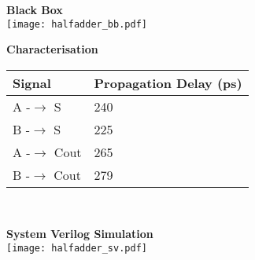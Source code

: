 \vspace{1cm}

\parbox{.45\linewidth}{
\begin{center}
\textbf{Black Box}\\[0.2cm]
 \texttt{[image: halfadder\_bb.pdf]}


\end{center}
}
\hfill
\parbox{.45\linewidth}{
\begin{center}
\textbf{Characterisation}\\[0.2cm]

    \begin{tabular}{|l|l|}
    \hline
    Signal      & Propagation Delay (ps) \\ \hline \hline
    A -$\rightarrow$ S      & 240                    \\
    B -$\rightarrow$ S      & 225                    \\
    A -$\rightarrow$ Cout   & 265                    \\
    B -$\rightarrow$ Cout   & 279                    \\ \hline
    \end{tabular}\\[0.5cm]


\end{center}
}

\vspace{1cm}

\begin{center}
\textbf{System Verilog Simulation}\\[0.2cm]

\texttt{[image: halfadder\_sv.pdf]}
\end{center}

